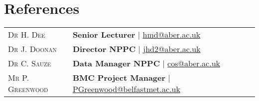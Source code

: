 \documentclass[a4paper,9pt]{article}
\begin{document}
\section{References}
\begin{tabular}{ll}	
  \textsc{Dr H. Dee} & \textbf{Senior Lecturer} | \href{hmd@aber.ac.uk}{hmd@aber.ac.uk}
  \\
  \textsc{Dr J. Doonan} & \textbf{Director NPPC} | \href{jhd2@aber.ac.uk}{jhd2@aber.ac.uk}
  \\
  \textsc{Dr C. Sauze} & \textbf{Data Manager NPPC} | \href{cos@aber.ac.uk}{cos@aber.ac.uk}
\\
  \textsc{Mr P. Greenwood} & \textbf{BMC Project Manager} | \href{PGreenwood@belfastmet.ac.uk}{PGreenwood@belfastmet.ac.uk}
  \\



\end{tabular}
\end{document}
